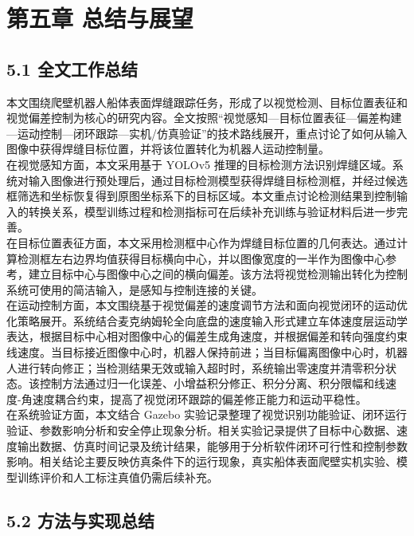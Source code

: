 \documentclass[UTF8,a4paper,12pt]{ctexrep}
\begin{document}
\chapter*{第五章 总结与展望}

\section{5.1 全文工作总结}

本文围绕爬壁机器人船体表面焊缝跟踪任务，形成了以视觉检测、目标位置表征和视觉偏差控制为核心的研究内容。全文按照“视觉感知—目标位置表征—偏差构建—运动控制—闭环跟踪—实机/仿真验证”的技术路线展开，重点讨论了如何从输入图像中获得焊缝目标位置，并将该位置转化为机器人运动控制量。\\

在视觉感知方面，本文采用基于 YOLOv5 推理的目标检测方法识别焊缝区域。系统对输入图像进行预处理后，通过目标检测模型获得焊缝目标检测框，并经过候选框筛选和坐标恢复得到原图坐标系下的目标区域。本文重点讨论检测结果到控制输入的转换关系，模型训练过程和检测指标可在后续补充训练与验证材料后进一步完善。\\

在目标位置表征方面，本文采用检测框中心作为焊缝目标位置的几何表达。通过计算检测框左右边界均值获得目标横向中心，并以图像宽度的一半作为图像中心参考，建立目标中心与图像中心之间的横向偏差。该方法将视觉检测输出转化为控制系统可使用的简洁输入，是感知与控制连接的关键。\\

在运动控制方面，本文围绕基于视觉偏差的速度调节方法和面向视觉闭环的运动优化策略展开。系统结合麦克纳姆轮全向底盘的速度输入形式建立车体速度层运动学表达，根据目标中心相对图像中心的偏差生成角速度，并根据偏差和转向强度约束线速度。当目标接近图像中心时，机器人保持前进；当目标偏离图像中心时，机器人进行转向修正；当检测结果无效或输入超时时，系统输出零速度并清零积分状态。该控制方法通过归一化误差、小增益积分修正、积分分离、积分限幅和线速度-角速度耦合约束，提高了视觉闭环跟踪的偏差修正能力和运动平稳性。\\

在系统验证方面，本文结合 Gazebo 实验记录整理了视觉识别功能验证、闭环运行验证、参数影响分析和安全停止现象分析。相关实验记录提供了目标中心数据、速度输出数据、仿真时间记录及统计结果，能够用于分析软件闭环可行性和控制参数影响。相关结论主要反映仿真条件下的运行现象，真实船体表面爬壁实机实验、模型训练评价和人工标注真值仍需后续补充。\\

\section{5.2 方法与实现总结}
\end{document}
